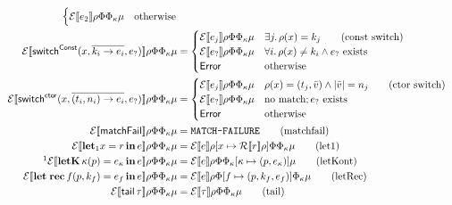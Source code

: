 \documentclass[a4paper, 11pt]{article}
\theoremstyle{remark}\newtheorem*{remark}{Remark}
\theoremstyle{definition}\newtheorem*{definition}{Definition}
\begin{document}
\begin{align*}
\begin{cases}
    \mathcal{E}\sem{e_2}\Env\FunTab\KontTab\mu & \text{otherwise}
  \end{cases}\\
  \mathcal{E}\sem{\switch^{\Const}(x, \overline{k_i \to e_i}, e_?)}\Env\FunTab\KontTab\mu &=
  \begin{cases}
    \mathcal{E}\sem{e_j}\Env\FunTab\KontTab\mu
    & \exists j.\, \Env(x) = k_j \tag{const switch} \\
    \mathcal{E}\sem{e_? }\Env\FunTab\KontTab\mu
    & \forall i.\, \Env(x) \neq k_i \land e_? \ \text{exists} \\
    \mathsf{Error} & \text{otherwise}
  \end{cases}\\
  \mathcal{E}\sem{\switch^{\ctor}(x, \overline{(t_i, n_i) \to e_i}, e_?)}\Env\FunTab\KontTab\mu &=
  \begin{cases}
    \mathcal{E}\sem{e_j}\Env\FunTab\KontTab\mu
    & \Env(x) = (t_j, \bar{v}) \land |\bar{v}| = n_j \tag{ctor switch} \\
    \mathcal{E}\sem{e_?}\Env\FunTab\KontTab\mu
    & \text{no match}; e_?\ \text{exists} \\
    \mathsf{Error} & \text{otherwise}
  \end{cases}\\
  \mathcal{E}\sem{\fail}\Env\FunTab\KontTab\mu &= \texttt{MATCH-FAILURE} \tag{matchfail}\\
  \mathcal{E}\sem{\letone x = r\, \mathbf{in}\, e}\Env\FunTab\KontTab\mu &=
  \mathcal{E}\sem{e}\Env[x \mapsto \mathcal{R}\sem{r}\Env]\FunTab\KontTab\mu \tag{let1}\\
  \footnotemark\mathcal{E}\sem{\letK\, \kappa(p) = e_\kappa\, \mathbf{in}\, e}\Env\FunTab\KontTab\mu &=
  \mathcal{E}\sem{e}\Env\FunTab\KontTab[\kappa \mapsto (p, e_\kappa)]\mu \tag{letKont}\\
  \mathcal{E}\sem{\letRec\, f(p, k_f) = e_f\, \mathbf{in}\, e}\Env\FunTab\KontTab\mu &=
  \mathcal{E}\sem{e}\Env\FunTab[f \mapsto (p, k_f, e_f)]\KontTab\mu \tag{letRec}\\
  \mathcal{E}\sem{\mathsf{tail}\, \tau}\Env\FunTab\KontTab\mu &=
  \mathcal{E}\sem{\tau}\Env\FunTab\KontTab\mu \tag{tail}
\end{align*}
\endgroup

\addtocounter{footnote}{-2}
\end{document}

